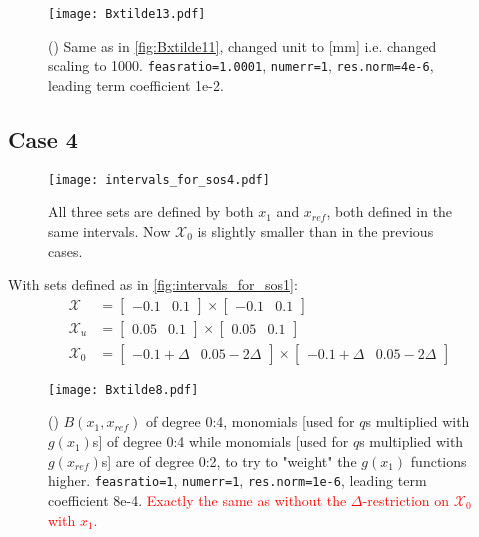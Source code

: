 \begin{figure}[H]
	\centering\texttt{[image: Bxtilde13.pdf]}
	\caption{() Same as in \autoref{fig:Bxtilde11}, changed unit  to [mm] i.e. changed scaling to 1000. \texttt{feasratio=1.0001}, \texttt{numerr=1}, \texttt{res.norm=4e-6}, leading term coefficient 1e-2.}
	\label{fig:Bxtilde13}
\end{figure}





\newpage
\subsection{Case 4}\label{case4}
\begin{figure}[htbp]
\centering\texttt{[image: intervals\_for\_sos4.pdf]}
\caption{All three sets are defined by both $x_1$ and $x_{ref}$, both defined in the same intervals. Now $\mathcal{X}_0$ is slightly smaller than in the previous cases.}
\label{fig:intervals_for_sos4}
\end{figure}

With sets defined as in \autoref{fig:intervals_for_sos1}:
\begin{align}
\mathcal{X} &= \begin{bmatrix} -0.1 & 0.1\end{bmatrix} \times \begin{bmatrix} -0.1 & 0.1\end{bmatrix}\\
\mathcal{X}_u &= \begin{bmatrix} 0.05 & 0.1\end{bmatrix} \times \begin{bmatrix} 0.05 & 0.1\end{bmatrix}\\
\mathcal{X}_0 &=\begin{bmatrix} -0.1+\Delta & 0.05-2\Delta\end{bmatrix} \times \begin{bmatrix} -0.1+\Delta & 0.05-2\Delta\end{bmatrix}
\end{align}


\begin{figure}[h]
\centering\texttt{[image: Bxtilde8.pdf]}
\caption{() $B(x_1,x_{ref})$ of degree 0:4,  monomials [used for $q$s multiplied with $g(x_1)$s] of degree 0:4 while monomials [used for $q$s multiplied with $g(x_{ref})$s] are of degree 0:2, to try to "weight" the $g(x_1)$ functions higher. \texttt{feasratio=1}, \texttt{numerr=1}, \texttt{res.norm=1e-6}, leading term coefficient 8e-4. \textcolor{red}{Exactly the same as without the $\Delta$-restriction on $\mathcal{X}_0$ with $x_1$.}}
\label{fig:Bxtilde8}
\end{figure}
